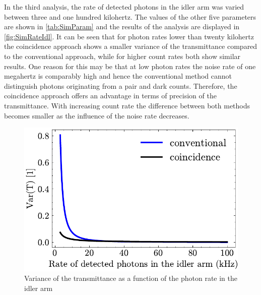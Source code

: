 In the third analysis, the rate of detected photons in the idler arm was varied between three and one hundred kilohertz. The values of the other five parameters are shown in \autoref{tab:SimParam} and the results of the analysis are displayed in \autoref{fig:SimRateIdl}. It can be seen that for photon rates lower than twenty kilohertz the coincidence approach shows a smaller variance of the transmittance compared to the conventional approach, while for higher count rates both show similar results. One reason for this may be that at low photon rates the noise rate of one megahertz is comparably high and hence the conventional method cannot distinguish photons originating from a pair and dark counts. Therefore, the coincidence approach offers an advantage in terms of precision of the transmittance. With increasing count rate the difference between both methods becomes smaller as the influence of the noise rate decreases. 
\begin{figure}[b!]
	\centering
	\includegraphics[width=.65\textwidth]{Images/SimulationSweepRateIdl_2.pdf}
	\caption{Variance of the transmittance as a function of the photon rate in the idler arm}
	\label{fig:SimRateIdl}
\end{figure}
